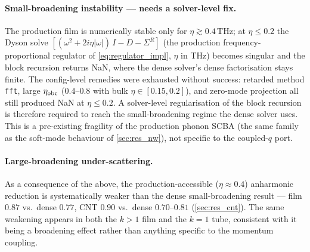 \paragraph{Small-broadening instability --- needs a solver-level fix.} The
production film is numerically stable only for $\eta\gtrsim0.4$\,THz; at
$\eta\leq0.2$ the Dyson solve
$[(\omega^2 + 2i\eta|\omega|)\,I - D - \Sigma^R]$ (the production
frequency-proportional regulator of \cref{eq:regulator_impl}, $\eta$ in THz)
becomes singular and the block recursion returns NaN, where the dense solver's
dense factorisation stays finite. The config-level remedies were
exhausted without success: retarded method \texttt{fft},
large $\eta_{\rm obc}$ ($0.4$--$0.8$ with bulk $\eta\in[0.15,0.2]$), and
zero-mode projection all still produced NaN at $\eta\leq0.2$. A
solver-level regularisation of the block recursion is therefore required
to reach the small-broadening regime the dense solver uses. This is a
pre-existing fragility of the production phonon SCBA (the same family as
the soft-mode behaviour of \cref{sec:res_nw}), not specific to the
coupled-$q$ port.

\paragraph{Large-broadening under-scattering.} As a consequence of the
above, the production-accessible ($\eta\approx0.4$) anharmonic reduction
is systematically weaker than the dense small-broadening result --- film
$0.87$ vs.\ dense $0.77$, CNT $0.90$ vs.\ dense $0.70$--$0.81$
(\cref{sec:res_cnt}). The same weakening appears in both the $k{>}1$ film
and the $k{=}1$ tube, consistent with it being a broadening effect rather
than anything specific to the momentum coupling.
